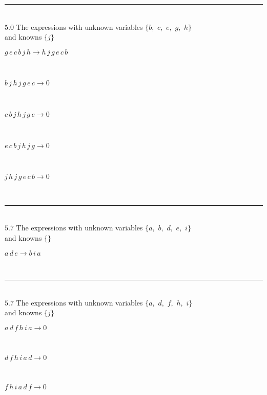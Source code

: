 \documentclass[rep10,leqno]{report}
\begin{document}
\rule[3pt]{6in}{.7pt}\\
$5.0$  The expressions with unknown variables $\{b,
$ $
c,
$ $
e,
$ $
g,
$ $
h\}$\\
and knowns $\{j\}$\smallskip\\
\begin{minipage}{6in}
$
g\,
 e\,
 c\,
 b\,
 j\,
 h\rightarrow h\,
 j\,
 g\,
 e\,
 c\,
 b
$
\end{minipage}\medskip \\
\begin{minipage}{6in}
$
b\,
 j\,
 h\,
 j\,
 g\,
 e\,
 c\rightarrow 0
$
\end{minipage}\medskip \\
\begin{minipage}{6in}
$
c\,
 b\,
 j\,
 h\,
 j\,
 g\,
 e\rightarrow 0
$
\end{minipage}\medskip \\
\begin{minipage}{6in}
$
e\,
 c\,
 b\,
 j\,
 h\,
 j\,
 g\rightarrow 0
$
\end{minipage}\medskip \\
\begin{minipage}{6in}
$
j\,
 h\,
 j\,
 g\,
 e\,
 c\,
 b\rightarrow 0
$
\end{minipage}\\
\rule[3pt]{6in}{.7pt}\\
$5.7$  The expressions with unknown variables $\{a,
$ $
b,
$ $
d,
$ $
e,
$ $
i\}$\\
and knowns $\{\}$\smallskip\\
\begin{minipage}{6in}
$
a\,
 d\,
 e\rightarrow b\,
 i\,
 a
$
\end{minipage}\\
\rule[3pt]{6in}{.7pt}\\
$5.7$  The expressions with unknown variables $\{a,
$ $
d,
$ $
f,
$ $
h,
$ $
i\}$\\
and knowns $\{j\}$\smallskip\\
\begin{minipage}{6in}
$
a\,
 d\,
 f\,
 h\,
 i\,
 a\rightarrow 0
$
\end{minipage}\medskip \\
\begin{minipage}{6in}
$
d\,
 f\,
 h\,
 i\,
 a\,
 d\rightarrow 0
$
\end{minipage}\medskip \\
\begin{minipage}{6in}
$
f\,
 h\,
 i\,
 a\,
 d\,
 f\rightarrow 0
$
\end{minipage}\medskip \\
\end{document}
